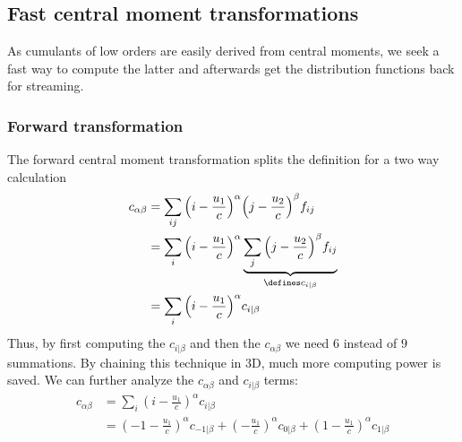 \subsection{Fast central moment transformations}
\label{sub:Fast central moment transformations}

As cumulants of low orders are easily derived from central moments, we seek a fast way to compute the latter and afterwards get the distribution functions back for streaming.

\subsubsection{Forward transformation}
\label{subs:Forward transformation}

The forward central moment transformation splits the definition for a two way calculation
\begin{equation}
  \begin{aligned}
    c_{\alpha\beta}
    & = \sum_{ij} {\left(i-\frac{u_1}{c}\right)}^\alpha {\left(j-\frac{u_2}{c}\right)}^\beta f_{ij} \\
    & = \sum_{i} {\left(i-\frac{u_1}{c}\right)}^\alpha \underbrace{\sum_{j} {\left(j-\frac{u_2}{c}\right)}^\beta f_{ij}}_{\defines c_{i|\beta}} \\
    & = \sum_{i} {\left(i-\frac{u_1}{c}\right)}^\alpha c_{i|\beta}
  \end{aligned}
\end{equation}
Thus, by first computing the $c_{i|\beta}$ and then the $c_{\alpha\beta}$ we need $6$ instead of $9$ summations.
By chaining this technique in 3D, much more computing power is saved.
We can further analyze the $c_{\alpha\beta}$ and $c_{i|\beta}$ terms:
\begin{equation}
  \begin{aligned}
    \label{eq:fast forward c alpha beta expanded}
    c_{\alpha\beta} & = \sum_{i} {\left(i-\frac{u_1}{c}\right)}^\alpha c_{i|\beta} \\
    & = {\left(-1-\frac{u_1}{c}\right)}^\alpha c_{-1|\beta} + {\left(-\frac{u_1}{c}\right)}^\alpha c_{0|\beta} + {\left(1-\frac{u_1}{c}\right)}^\alpha c_{1|\beta}
  \end{aligned}
\end{equation}

